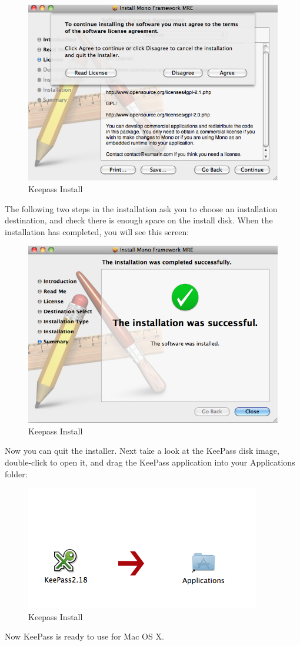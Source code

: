 \begin{figure}[htbp]
\centering
\includegraphics{keepass_14.png}
\caption{Keepass Install}
\end{figure}

The following two steps in the installation ask you to choose an
installation destination, and check there is enough space on the install
disk. When the installation has completed, you will see this screen:

\begin{figure}[htbp]
\centering
\includegraphics{keepass_15.png}
\caption{Keepass Install}
\end{figure}

Now you can quit the installer. Next take a look at the KeePass disk
image, double-click to open it, and drag the KeePass application into
your Applications folder:

\begin{figure}[htbp]
\centering
\includegraphics{keepass_16.png}
\caption{Keepass Install}
\end{figure}

Now KeePass is ready to use for Mac OS X.
